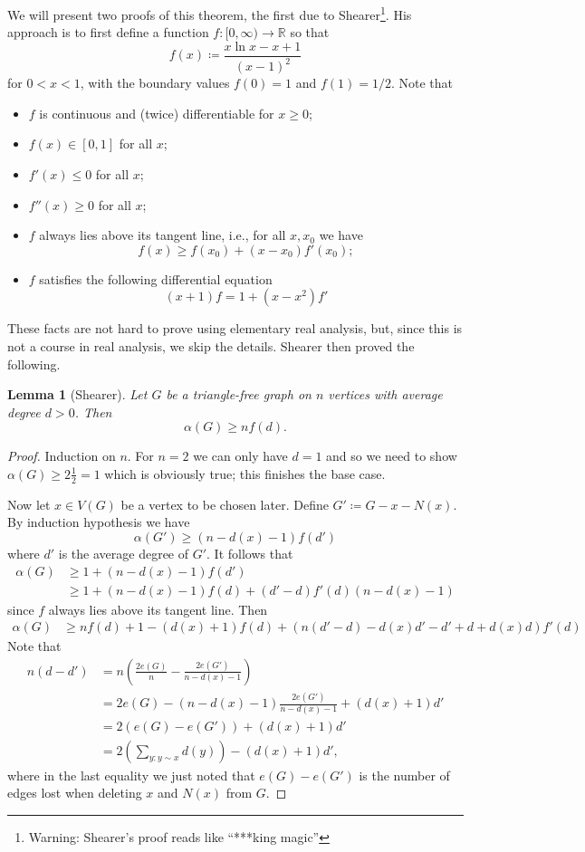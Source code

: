 \documentclass{report}
\theoremstyle{definition}
\theoremstyle{plain}
\newtheorem{lem}[thm]{Lemma}
\theoremstyle{definition}
\begin{document}
	We will present two proofs of this theorem, the first due to Shearer\footnote{Warning: Shearer's proof reads like ``***king magic''}. His approach is to first define a function $f\colon [0,\infty) \to \mathbb{R}$ so that
	\[
		f(x) \coloneqq \frac{x\ln x - x + 1}{(x-1)^2}
	\]
	for $0< x < 1$, with the boundary values $f(0) = 1$ and $f(1) = 1/2$. Note that
	\begin{itemize}
		\item $f$ is continuous and (twice) differentiable for $x\geq 0$;
		\item $f(x) \in [0,1]$ for all $x$;
		\item $f'(x) \leq 0$ for all $x$;
		\item $f''(x) \geq 0$ for all $x$;
		\item $f$ always lies above its tangent line, i.e., for all $x,x_0$ we have
		\[
			f(x) \geq f(x_0) + (x - x_0)f'(x_0);
		\]
		\item $f$ satisfies the following differential equation
		\[
			(x+ 1)f = 1 + (x - x^2)f'
		\]
	\end{itemize}
	These facts are not hard to prove using elementary real analysis, but, since this is not a course in real analysis, we skip the details. Shearer then proved the following.
	\begin{lem}[Shearer]
		Let $G$ be a triangle-free graph on $n$ vertices with average degree $d>0$. Then
		\[
			\alpha(G) \geq nf(d).
		\]
	\end{lem}
	\begin{proof}
		Induction on $n$. For $n = 2$ we can only have $d = 1$ and so we need to show $\alpha(G) \geq 2\frac{1}{2} = 1$ which is obviously true; this finishes the base case.
		
		Now let $x\in V(G)$ be a vertex to be chosen later. Define $G' \coloneqq G - x - N(x)$.  By induction hypothesis we have
		\[
			\alpha(G') \geq (n - d(x) - 1) f(d')
		\]
		where $d'$ is the average degree of $G'$. It follows that
		\begin{align*}
			\alpha(G) &\geq 1 + (n - d(x) - 1)f(d')\\
			&\geq 1 + (n - d(x) - 1)f(d) + (d' - d)f'(d)(n - d(x) - 1) 
		\end{align*}
		since $f$ always lies above its tangent line. Then
		\begin{align*}
			\alpha(G) &\geq nf(d) + 1 - (d(x) + 1)f(d) + (n(d'-d) -d(x)d' - d' + d + d(x)d) f'(d)
		\end{align*}
		Note that
		\begin{align*}
			n(d-d') &= n(\frac{2e(G)}{n} - \frac{2e(G')}{n - d(x) - 1})\\
			&= 2e(G) - (n - d(x) - 1)\frac{2e(G')}{n - d(x) - 1} + (d(x) + 1)d'\\
			&= 2(e(G) - e(G')) + (d(x) + 1)d'\\
			&= 2(\sum_{y\colon y\sim x}d(y)) - (d(x) + 1)d',
		\end{align*}
		where in the last equality we just noted that $e(G) - e(G')$ is the number of edges lost when deleting $x$ and $N(x)$ from $G$.
	\end{proof}
\end{document}
